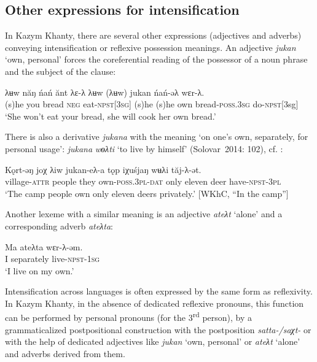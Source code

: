 \documentclass[output=paper]{langscibook}
\begin{document}
\subsection{{Other} {expressions} {for} {intensification}}\label{sec:Volkova:7.3}

In Kazym Khanty, there are several other expressions (adjectives and adverbs) conveying intensification or reflexive possession meanings. An adjective \textit{jukan} ‘own, personal’ forces the coreferential reading of the possessor of a noun phrase and the subject of the clause: 


 
 

\ea 
\label{ex:Volkova:69}
 \gll λʉw năŋ ńań ănt λɛ-λ  λʉw (λʉw) jukan ńań-əλ  wɛr-λ.\\
 (s)he you bread \textsc{neg} eat\textsc{{}-npst[3sg]} (s)he (s)he own bread\textsc{{}-poss.3sg} do\textsc{{}-npst[}3sg]\\
 \glt ‘She won’t eat your bread, she will cook her own bread.’
\z




There is also a derivative \textit{jukana} with the meaning ‘on one’s own, separately, for personal usage’: \textit{jukana} \textit{wɵλti} ‘to live by himself’ (Solovar~2014: 102), cf. :


\ea 
\label{ex:Volkova:70}
 \gll Kǫrt-əŋ joχ λiw jukan-eλ-a tǫp iχuśjaŋ wʉλi tăj-λ-ət.\\
 village\textsc{{}-attr} people they own\textsc{{}-poss.3pl-dat} only eleven deer have\textsc{{}-npst-3pl}\\
 \glt ‘The camp people own only eleven deers privately.’ [WKhC, “In the camp”]
\z


Another lexeme with a similar meaning is an adjective \textit{ateλt} ‘alone’ and a corresponding adverb \textit{ateλta}:


 \ea 
\label{ex:Volkova:71}
 \gll Ma ateλta wɛr-λ-əm.\\
 I separately live-\textsc{npst-1sg}\\
 \glt ‘I live on my own.’
\z



Intensification across languages is often expressed by the same form as reflexivity. In Kazym Khanty, in the absence of dedicated reflexive pronouns, this function can be performed by personal pronouns (for the 3\textsuperscript{rd} person), by a grammaticalized postpositional construction with the postposition \textit{satta-/saχt-} or with the help of dedicated adjectives like \textit{jukan} ‘own, personal’ or \textit{ateλt} ‘alone’ and adverbs derived from them.
\end{document}
